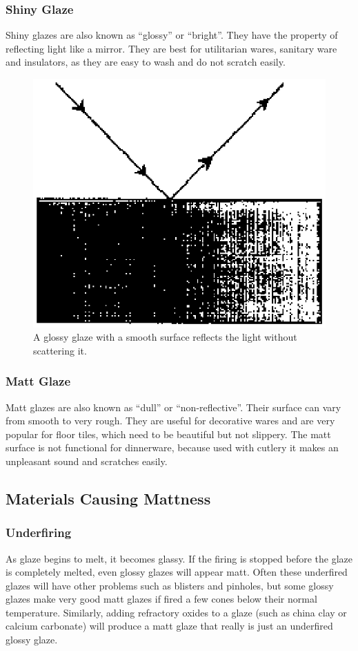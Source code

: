 \subsubsection{Shiny Glaze}
Shiny glazes are also known as ``glossy'' or ``bright''. They have the property 
of 
reflecting light like a mirror. They are best for utilitarian wares, sanitary 
ware and insulators, as they are easy to wash and do not scratch easily.
\begin{figure}[htbp!]
  \centering
  \includegraphics[width=0.5\linewidth]{img/glossyglaze.eps}
  \caption{A glossy glaze with a smooth surface reflects the light without 
  scattering it.}
  \label{fig:glossyglaze}
\end{figure}
\subsubsection{Matt Glaze}
Matt glazes are also known as ``dull'' or ``non-reflective''. Their surface can 
vary from smooth to very rough. They are useful for decorative wares and are 
very popular for floor tiles, which need to be beautiful but not slippery. The 
matt surface is not functional for dinnerware, because used with cutlery it 
makes an unpleasant sound and scratches easily.
\subsection{Materials Causing Mattness}
\subsubsection{Underfiring}
As glaze begins to melt, it becomes glassy. If the firing is stopped before the 
glaze is completely melted, even glossy glazes will appear matt. Often these 
underfired glazes will have other problems such as blisters and pinholes, but 
some glossy glazes make very good matt glazes if fired a few cones below their 
normal temperature. Similarly, adding refractory oxides to a glaze (such as 
china clay or calcium carbonate) will produce a matt glaze that really is just 
an underfired glossy glaze.
